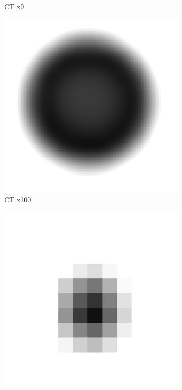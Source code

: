 \documentclass[parskip,bibtotoc,final,twoside=false,titlepage,a4paper,english,12pt,titlepage,a4paper]{scrbook}
\begin{document}
\begin{figure}[!thb]
\begin{subfigure}[b]{0.32\textwidth}
    \caption{CT x9}
    \label{fig:CT_x9}
  \end{subfigure}
    \hfill
  \begin{subfigure}[b]{0.32\textwidth}
    \includegraphics[scale=.11]{slicer3D/profiles/CT_x100.png}
    \caption{CT x100}
    \label{fig:CT_x100}
  \end{subfigure}
  \begin{subfigure}[b]{0.32\textwidth}
    \includegraphics[scale=.11]{slicer3D/profiles/MR_x1.png}

\end{subfigure}
\end{figure}
\end{document}
